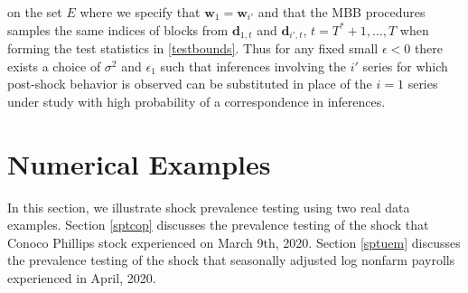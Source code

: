 \documentclass[11pt]{article}
\newcommand{\dbf}{\textbf{d}}
\theoremstyle{definition}
\begin{document}
on the set $E$ where we specify that $\textbf{w}_1 = \textbf{w}_{i'}$ and that the MBB procedures samples the same indices of blocks from $\dbf_{1,t}$ and $\dbf_{i',t}$, $t = T^*+1,\ldots, T$ when forming the test statistics in \eqref{testbounds}. Thus for any fixed small $\epsilon < 0$ there exists a choice of $\sigma^2$ and $\epsilon_1$ such that inferences involving the $i'$ series for which post-shock behavior is observed can be substituted in place of the $i = 1$ series under study with high probability of a correspondence in inferences. 














\section{Numerical Examples}

\label{sec::ne}

In this section, we illustrate shock prevalence testing using two real data examples. Section \ref{sptcop} discusses the prevalence testing of the shock that Conoco Phillips stock experienced on March 9th, 2020. Section \ref{sptuem} discusses the prevalence testing of the shock that seasonally adjusted log nonfarm payrolls experienced in April, 2020. 
\end{document}
